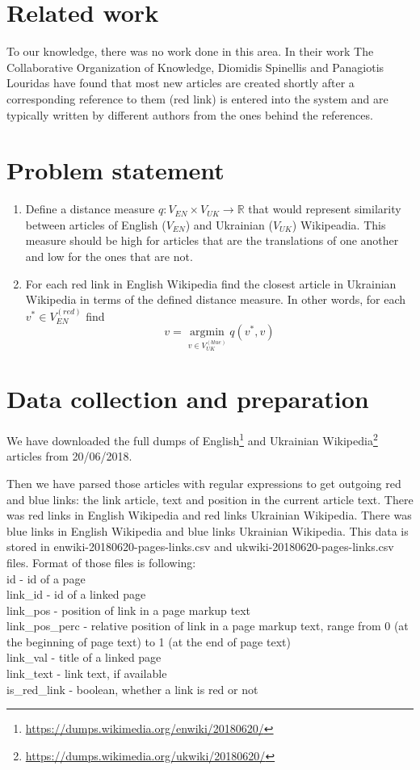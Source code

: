 \documentclass[11pt,a4paper]{article}
\begin{document}
\section{Related work}

To our knowledge, there was no work done in this area. In their work The Collaborative Organization of Knowledge, Diomidis Spinellis and Panagiotis Louridas \cite{spinellis} have found that most new articles are created shortly after a corresponding reference to them (red link) is entered into the system and are typically written by different authors from the ones behind the references.

\section{Problem statement}

\begin{enumerate}
	\item Define a distance measure $q: V_{EN} \times V_{UK} \to \mathbb{R}$ that would represent similarity between articles of English ($V_{EN}$) and Ukrainian ($V_{UK}$) Wikipeadia. This measure should be high for articles that are the translations of one another and low for the ones that are not.
	\item For each red link in English Wikipedia find the closest article in Ukrainian Wikipedia in terms of the defined distance measure. In other words, for each $v^{*} \in V_{EN}^{(red)}$ find
	\[ v = \operatorname*{argmin}_{v \in V_{UK}^{(blue)}} q(v^{*}, v) \]
\end{enumerate}

\section{Data collection and preparation}

We have downloaded the full dumps of English\footnote{\url{https://dumps.wikimedia.org/enwiki/20180620/}} and Ukrainian Wikipedia\footnote{\url{https://dumps.wikimedia.org/ukwiki/20180620/}} articles from 20/06/2018. 

Then we have parsed those articles with regular expressions to get outgoing red and blue links: the link article, text and position in the current article text. There was red links in English Wikipedia and red links Ukrainian Wikipedia. There was blue links in English Wikipedia and blue links Ukrainian Wikipedia. This data is stored in enwiki-20180620-pages-links.csv and ukwiki-20180620-pages-links.csv files. Format of those files is following:\\
id - id of a page\\
link\_id - id of a linked page\\
link\_pos - position of link in a page markup text\\  
link\_pos\_perc - relative position of link in a page markup text, range from 0 (at the beginning of page text) to 1 (at the end of page text)\\  
link\_val - title of a linked page\\  
link\_text - link text, if available\\  
is\_red\_link - boolean, whether a link is red or not\\  
\end{document}

